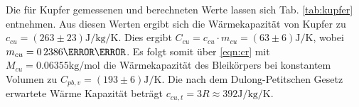 Die für Kupfer gemessenen und berechneten Werte lassen sich Tab. \ref{tab:kupfer} entnehmen. Aus diesen Werten ergibt sich die Wärmekapazität von Kupfer zu $c_{cu} = (263 \pm 23) \si{\joule \per \kilo \gram \per\kelvin}$. Dies ergibt $C_{cu} = c_{cu} \cdot m_{cu} = (63 \pm 6)\si{\joule\per\kelvin}$, wobei $m_{cu} = \si{0.2386}{\kilo\gram}$. Es folgt somit über \eqref{eqn:cr} mit $M_{cu} = 0.06355 \si{\kilo \gram \per \mole}$ \cite{Molmasse} die Wärmekapazität des Bleikörpers bei konstantem Volumen zu $C_{pb,v}=(193 \pm 6) \si{\joule \per \kelvin}$. Die nach dem Dulong-Petitschen Gesetz erwartete Wärme Kapazität beträgt $c_{cu,t} = 3 R \approx 392 \si{\joule \per \kilo \gram \per\kelvin}$.
